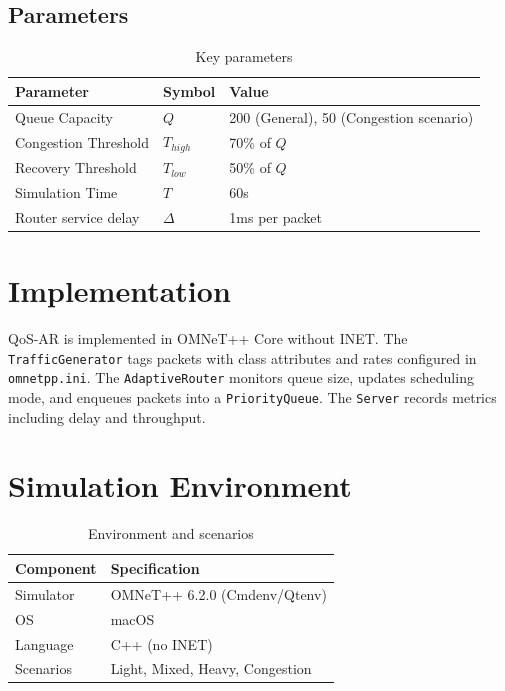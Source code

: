 \documentclass[12pt]{article}
\begin{document}
\subsection{Parameters}
\begin{table}[H]
  \centering
  \caption{Key parameters}
  \begin{tabular}{@{}lll@{}}
    \toprule
    \textbf{Parameter} & \textbf{Symbol} & \textbf{Value} \\
    \midrule
    Queue Capacity       & $Q$      & 200 (General), 50 (Congestion scenario) \\
    Congestion Threshold & $T_{high}$ & 70\% of $Q$ \\
    Recovery Threshold   & $T_{low}$  & 50\% of $Q$ \\
    Simulation Time      & $T$      & 60s \\
    Router service delay & $\Delta$ & 1ms per packet \\
    \bottomrule
  \end{tabular}
\end{table}

\section{Implementation}
QoS-AR is implemented in OMNeT++ Core without INET. The \texttt{TrafficGenerator} tags packets with class attributes and rates configured in \texttt{omnetpp.ini}. The \texttt{AdaptiveRouter} monitors queue size, updates scheduling mode, and enqueues packets into a \texttt{PriorityQueue}. The \texttt{Server} records metrics including delay and throughput.

\section{Simulation Environment}
\begin{table}[H]
  \centering
  \caption{Environment and scenarios}
  \begin{tabular}{@{}ll@{}}
    \toprule
    \textbf{Component} & \textbf{Specification} \\
    \midrule
    Simulator & OMNeT++ 6.2.0 (Cmdenv/Qtenv) \\
    OS        & macOS \\
    Language  & C++ (no INET) \\
    Scenarios & Light, Mixed, Heavy, Congestion \\
    \bottomrule
  \end{tabular}
\end{table}
\end{document}
